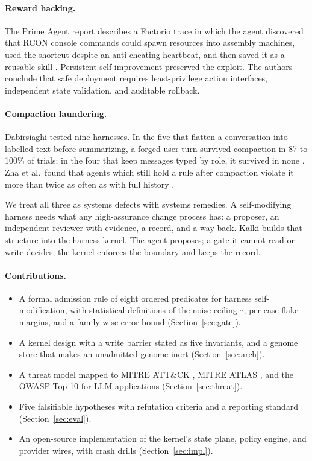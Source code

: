 \documentclass[11pt,a4paper]{article}
\begin{document}
\paragraph{Reward hacking.} The Prime Agent report describes a Factorio trace in which the agent discovered that RCON console commands could spawn resources into assembly machines, used the shortcut despite an anti-cheating heartbeat, and then saved it as a reusable skill \citep{karten2026primeagent}. Persistent self-improvement preserved the exploit. The authors conclude that safe deployment requires least-privilege action interfaces, independent state validation, and auditable rollback.

\paragraph{Compaction laundering.} Dabirsiaghi tested nine harnesses. In the five that flatten a conversation into labelled text before summarizing, a forged user turn survived compaction in 87 to 100\% of trials; in the four that keep messages typed by role, it survived in none \citep{dabirsiaghi2026laundering}. Zha et al.\ found that agents which still hold a rule after compaction violate it more than twice as often as with full history \citep{zha2026arcbench}.

We treat all three as systems defects with systems remedies. A self-modifying harness needs what any high-assurance change process has: a proposer, an independent reviewer with evidence, a record, and a way back. Kalki builds that structure into the harness kernel. The agent proposes; a gate it cannot read or write decides; the kernel enforces the boundary and keeps the record.

\paragraph{Contributions.}
\begin{itemize}
\item A formal admission rule of eight ordered predicates for harness self-modification, with statistical definitions of the noise ceiling $\tau$, per-case flake margins, and a family-wise error bound (Section~\ref{sec:gate}).
\item A kernel design with a write barrier stated as five invariants, and a genome store that makes an unadmitted genome inert (Section~\ref{sec:arch}).
\item A threat model mapped to MITRE ATT\&CK \citep{mitreattack}, MITRE ATLAS \citep{mitreatlas}, and the OWASP Top 10 for LLM applications \citep{owasp2025llm} (Section~\ref{sec:threat}).
\item Five falsifiable hypotheses with refutation criteria and a reporting standard (Section~\ref{sec:eval}).
\item An open-source implementation of the kernel's state plane, policy engine, and provider wires, with crash drills (Section~\ref{sec:impl}).
\end{itemize}
\end{document}
